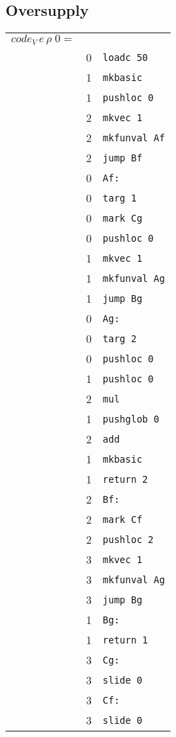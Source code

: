 \documentclass[10pt,a4paper]{article}
\begin{document}
	\subsection{Oversupply}
	
	\begin{tabular}{l l l}
		$code_V \, e \, \rho \; 0 = $ &  &\\
		& 0 & \texttt{loadc 50} \\
		& 1 & \texttt{mkbasic} \\
		& 1 & \texttt{pushloc 0} \\
		& 2 & \texttt{mkvec 1} \\
		& 2 & \texttt{mkfunval Af} \\
		& 2 & \texttt{jump Bf} \\
		
		& 0 & \texttt{Af:} \\
		& 0 & \texttt{targ 1} \\
		& 0 & \texttt{mark Cg} \\
		& 0 & \texttt{pushloc 0} \\
		& 1 & \texttt{mkvec 1} \\
		& 1 & \texttt{mkfunval Ag} \\
		& 1 & \texttt{jump Bg} \\
		
		& 0 & \texttt{Ag:} \\
		& 0 & \texttt{targ 2} \\
		& 0 & \texttt{pushloc 0} \\
		& 1 & \texttt{pushloc 0} \\
		& 2 & \texttt{mul} \\
		& 1 & \texttt{pushglob 0} \\
		& 2 & \texttt{add} \\
		& 1 & \texttt{mkbasic} \\
		& 1 & \texttt{return 2} \\
		
		& 2 & \texttt{Bf:} \\
		& 2 & \texttt{mark Cf} \\
		& 2 & \texttt{pushloc 2} \\
		& 3 & \texttt{mkvec 1} \\
		& 3 & \texttt{mkfunval Ag} \\
		& 3 & \texttt{jump Bg} \\
		
		& 1 & \texttt{Bg:} \\
		& 1 & \texttt{return 1} \\
		
		& 3 & \texttt{Cg:} \\
		& 3 & \texttt{slide 0} \\
		
		& 3 & \texttt{Cf:} \\
		& 3 & \texttt{slide 0} \\
	\end{tabular}
	
\end{document}
